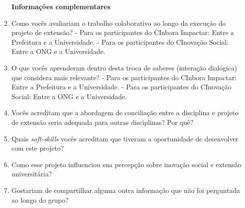 \begin{enumerate}
\par\vspace{1\baselineskip}
\textbf{Informações complementares}
    \item Como vocês avaliariam o trabalho colaborativo ao longo da execução do projeto de extensão?
     - Para os participantes do CInbora Impactar: Entre a Prefeitura e a Universidade.
    - Para os participantes do CInovação Social: Entre a \gls{ONG} e a Universidade.
    \item O que vocês aprenderam dentro desta troca de saberes (interação dialógica) que considera mais relevante?  
     - Para os participantes do CInbora Impactar: Entre a Prefeitura e a Universidade.
    - Para os participantes do CInovação Social: Entre a \gls{ONG} e a Universidade.
    \item Vocês acreditam que a abordagem de conciliação entre a disciplina e projeto de extensão seria adequada para outras disciplinas? Por quê? 
    \item Quais \textit{soft-skills} vocês acreditam que tiveram a oportunidade de desenvolver com este projeto?
    \item Como esse projeto influenciou sua percepção sobre inovação social e extensão universitária? 
    \item Gostariam de compartilhar alguma outra informação que não foi perguntada ao longo do grupo?  
\end{enumerate}
\par\vspace{1\baselineskip}
